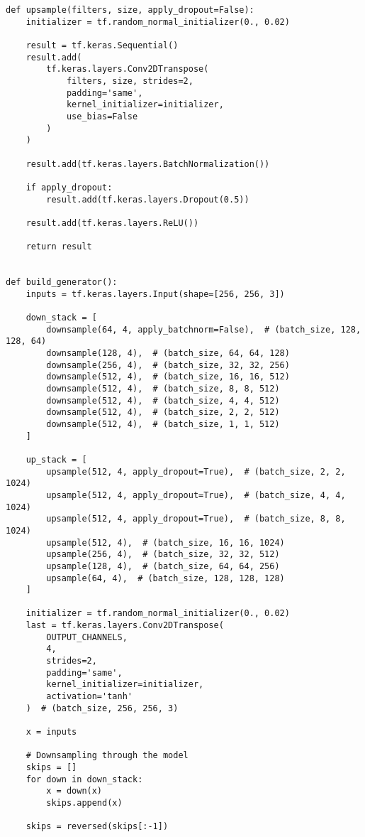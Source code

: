 \begin{lstlisting}
def upsample(filters, size, apply_dropout=False):
    initializer = tf.random_normal_initializer(0., 0.02)

    result = tf.keras.Sequential()
    result.add(
        tf.keras.layers.Conv2DTranspose(
            filters, size, strides=2,
            padding='same',
            kernel_initializer=initializer,
            use_bias=False
        )
    )

    result.add(tf.keras.layers.BatchNormalization())

    if apply_dropout:
        result.add(tf.keras.layers.Dropout(0.5))

    result.add(tf.keras.layers.ReLU())

    return result


def build_generator():
    inputs = tf.keras.layers.Input(shape=[256, 256, 3])

    down_stack = [
        downsample(64, 4, apply_batchnorm=False),  # (batch_size, 128, 128, 64)
        downsample(128, 4),  # (batch_size, 64, 64, 128)
        downsample(256, 4),  # (batch_size, 32, 32, 256)
        downsample(512, 4),  # (batch_size, 16, 16, 512)
        downsample(512, 4),  # (batch_size, 8, 8, 512)
        downsample(512, 4),  # (batch_size, 4, 4, 512)
        downsample(512, 4),  # (batch_size, 2, 2, 512)
        downsample(512, 4),  # (batch_size, 1, 1, 512)
    ]

    up_stack = [
        upsample(512, 4, apply_dropout=True),  # (batch_size, 2, 2, 1024)
        upsample(512, 4, apply_dropout=True),  # (batch_size, 4, 4, 1024)
        upsample(512, 4, apply_dropout=True),  # (batch_size, 8, 8, 1024)
        upsample(512, 4),  # (batch_size, 16, 16, 1024)
        upsample(256, 4),  # (batch_size, 32, 32, 512)
        upsample(128, 4),  # (batch_size, 64, 64, 256)
        upsample(64, 4),  # (batch_size, 128, 128, 128)
    ]

    initializer = tf.random_normal_initializer(0., 0.02)
    last = tf.keras.layers.Conv2DTranspose(
        OUTPUT_CHANNELS,
        4,
        strides=2,
        padding='same',
        kernel_initializer=initializer,
        activation='tanh'
    )  # (batch_size, 256, 256, 3)

    x = inputs

    # Downsampling through the model
    skips = []
    for down in down_stack:
        x = down(x)
        skips.append(x)

    skips = reversed(skips[:-1])

\end{lstlisting}
